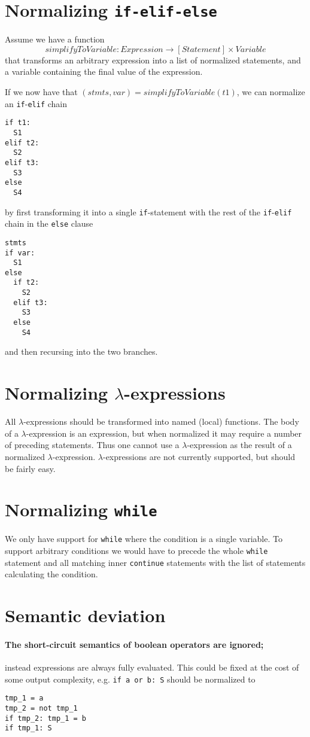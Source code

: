 \documentclass[11pt]{report}
\begin{document}
\begin{description}
\section{Normalizing {\tt if-elif-else}}
Assume we have a function $$simplifyToVariable: Expression \rightarrow
[Statement] \times Variable$$ that transforms an arbitrary expression
into a list of normalized statements, and a variable containing the
final value of the expression.

If we now have that $(stmts, var) = simplifyToVariable(t1)$, we can
normalize an \verb!if!-\verb!elif! chain
\begin{verbatim}
if t1:
  S1
elif t2:
  S2
elif t3:
  S3
else
  S4
\end{verbatim}
by first transforming it into a single \verb!if!-statement with the rest of the
\verb!if!-\verb!elif! chain in the \verb!else! clause
\begin{verbatim}
stmts
if var:
  S1
else
  if t2:
    S2
  elif t3:
    S3
  else
    S4
\end{verbatim}
and then recursing into the two branches.

\section{Normalizing $\lambda$-expressions}
All $\lambda$-expressions should be transformed into named (local)
functions. The body of a $\lambda$-expression is an expression, but
when normalized it may require a number of preceding statements. Thus
one cannot use a $\lambda$-expression as the result of a normalized
$\lambda$-expression. $\lambda$-expressions are not currently
supported, but should be fairly easy.

\section{Normalizing {\tt while}}
We only have support for {\tt while} where the condition is a single
variable. To support arbitrary conditions we would have to precede the
whole {\tt while} statement and all matching inner {\tt continue}
statements with the list of statements calculating the condition.

\section{Semantic deviation}
\paragraph{The short-circuit semantics of boolean operators are ignored;}
  instead expressions are always fully evaluated. This could be fixed
  at the cost of some output complexity, e.g. \verb|if a or b: S| should
  be normalized to
\begin{verbatim}
tmp_1 = a
tmp_2 = not tmp_1
if tmp_2: tmp_1 = b
if tmp_1: S
\end{verbatim}


\end{description}
\end{document}
